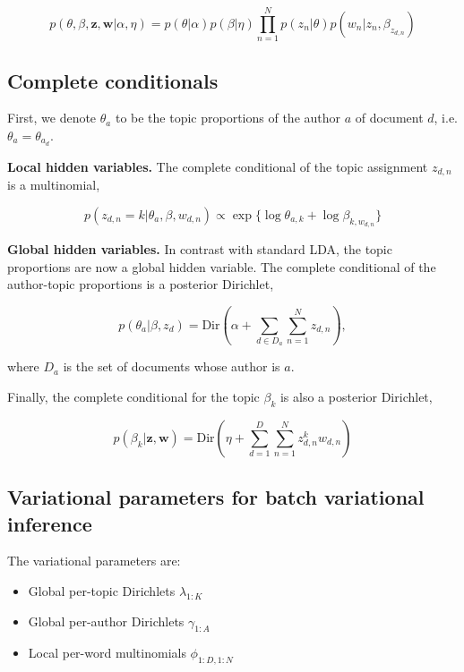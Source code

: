 \begin{equation}
p(\theta,\beta,\mathbf{z},\mathbf{w}|\alpha,\eta) = p(\theta|\alpha) p(\beta|\eta) \prod_{n=1}^{N}{p(z_n|\theta)p(w_n|z_n,\beta_{z_{d,n}})}
\end{equation}


\subsection{Complete conditionals}

First, we denote $\theta_a$ to be the topic proportions of the author $a$ of document $d$, i.e. $\theta_a = \theta_{a_d}$.

\textbf{Local hidden variables.} The complete conditional of the topic assignment $z_{d,n}$ is a multinomial,

\begin{equation}
p(z_{d,n} = k | \theta_a, \beta, w_{d,n}) \propto \exp \{ \log \theta_{a,k} + \log \beta_{k,w_{d,n}} \}
\end{equation}

\textbf{Global hidden variables.} In contrast with standard LDA, the topic proportions are now a global hidden variable.
The complete conditional of the author-topic proportions is a posterior Dirichlet,

\begin{equation}
p(\theta_a | \beta, z_{d}) = \text{Dir} ( \alpha + \sum_{d \in D_a}{\sum_{n=1}^{N}{z_{d,n}}}),
\end{equation}

\noindent where $D_a$ is the set of documents whose author is $a$.

Finally, the complete conditional for the topic $\beta_k$ is also a posterior Dirichlet,

\begin{equation}
p(\beta_k | \mathbf{z}, \mathbf{w}) = \text{Dir} ( \eta + \sum_{d=1}^{D}{\sum_{n=1}^{N}{z^k_{d,n}w_{d,n}}})
\end{equation}



\subsection{Variational parameters for batch variational inference}

The variational parameters are:
\begin{itemize}
	\item Global per-topic Dirichlets $\lambda_{1:K}$
	\item Global per-author Dirichlets $\gamma_{1:A}$
	\item Local per-word multinomials $\phi_{1:D,1:N}$
\end{itemize}

